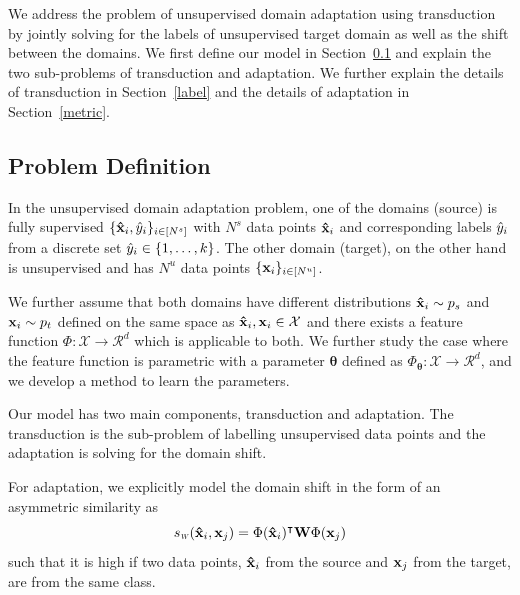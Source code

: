 We address the problem of unsupervised domain adaptation using transduction by jointly solving for the labels of unsupervised target domain as well as the shift between the domains. We first define our model in Section~\ref{prob:def} and explain the two sub-problems of transduction and adaptation. We further explain the details of transduction in Section~\ref{label} and the details of adaptation in Section~\ref{metric}.

\subsection{Problem Definition}
\label{prob:def}
In the unsupervised domain adaptation problem, one of the domains (source) is fully supervised $\{\mathbf{\hat{x}}_i, \hat{y}_i \}_{i \in [N^s]}$ with $N^s$ data points $\mathbf{\hat{x}}_i$ and corresponding labels $\hat{y}_i$ from a discrete set $\hat{y}_i \in \{1,\ldots, k \}$.  The other domain (target), on the other hand is unsupervised and has $N^u$ data points $\{\mathbf{x}_i \}_{i \in [N^u]}$. 

We further assume that both domains have different distributions $\mathbf{\hat{x}}_i \sim p_s$ and $\mathbf{x}_i \sim p_t$ defined on the same space as $\mathbf{\hat{x}}_i,\mathbf{x}_i \in \mathcal{X}$ and there exists a feature function \mbox{$\Phi:\mathcal{X}\rightarrow \mathcal{R}^d$} which is applicable to both. We further study the case where the feature function is parametric with a parameter $\mathbf{\theta}$ defined as \mbox{$\Phi_\mathbf{\theta}:\mathcal{X}\rightarrow \mathcal{R}^d$}, and we develop a method to learn the parameters.

Our model has two main components, transduction and adaptation. The transduction is the sub-problem of labelling unsupervised data points and the adaptation is solving for the domain shift. 

For adaptation, we explicitly model the domain shift in the form of an asymmetric similarity as
\begin{equation}
\sw(\xsi,\xuj) = \Phi(\xsi)^\intercal \mathbf{W} \Phi(\xuj)
\end{equation}
such that it is high if two data points, $\mathbf{\hat{x}}_i$ from the source and $\mathbf{x}_j$ from the target, are from the same class.

